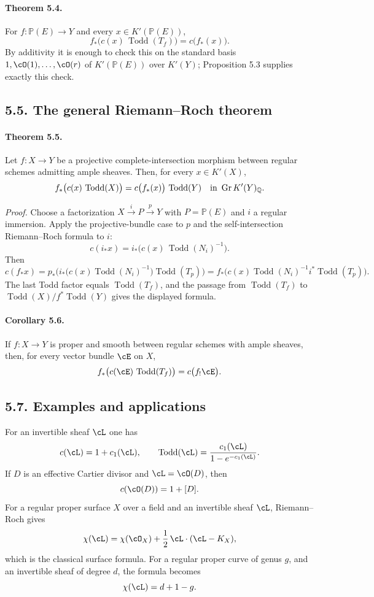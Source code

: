 \documentclass[11pt]{article}
\theoremstyle{plain}
\theoremstyle{definition}
\theoremstyle{remark}
\newcommand{\bP}{\mathbb P}
\newcommand{\QQ}{\mathbb Q}
\DeclareMathOperator{\Gr}{Gr}
\providecommand{\xto}[1]{\xrightarrow{#1}}
\providecommand{\Todd}{\operatorname{Todd}}
\begin{document}
\paragraph{Theorem 5.4.}
For $f:\bP(E)\to Y$ and every $x\in K'(\bP(E))$,
\[
 f_*\bigl(c(x)\,\Todd(T_f)\bigr)=c\bigl(f_*(x)\bigr).
\]
By additivity it is enough to check this on the standard basis $1,\cO(1),\ldots,\cO(r)$ of $K'(\bP(E))$ over $K'(Y)$; Proposition 5.3 supplies exactly this check.

\subsection*{5.5. The general Riemann--Roch theorem}

\paragraph{Theorem 5.5.}
Let $f:X\to Y$ be a projective complete-intersection morphism between regular schemes admitting ample sheaves. Then, for every $x\in K'(X)$,
\[
 f_*\bigl(c(x)\,\Todd(X)\bigr)=c\bigl(f_*(x)\bigr)\,\Todd(Y)
 \quad\hbox{in }\Gr K'(Y)_\QQ .
\]

\emph{Proof.}
Choose a factorization $X\xto{i}P\xto{p}Y$ with $P=\bP(E)$ and $i$ a regular immersion. Apply the projective-bundle case to $p$ and the self-intersection Riemann--Roch formula to $i$:
\[
 c(i_*x)=i_*\bigl(c(x)\,\Todd(N_i)^{-1}\bigr).
\]
Then
\[
 c(f_*x)=p_*\bigl(i_*\bigl(c(x)\Todd(N_i)^{-1}\bigr)\Todd(T_p)\bigr)
       =f_*\bigl(c(x)\Todd(N_i)^{-1}i^*\Todd(T_p)\bigr).
\]
The last Todd factor equals $\Todd(T_f)$, and the passage from $\Todd(T_f)$ to $\Todd(X)/f^*\Todd(Y)$ gives the displayed formula.

\paragraph{Corollary 5.6.}
If $f:X\to Y$ is proper and smooth between regular schemes with ample sheaves, then, for every vector bundle $\cE$ on $X$,
\[
 f_*\bigl(c(\cE)\,\Todd(T_f)\bigr)=c\bigl(f_!\cE\bigr).
\]

\subsection*{5.7. Examples and applications}

For an invertible sheaf $\cL$ one has
\[
 c(\cL)=1+c_1(\cL),\qquad
 \Todd(\cL)=\frac{c_1(\cL)}{1-e^{-c_1(\cL)}}.
\]
If $D$ is an effective Cartier divisor and $\cL=\cO(D)$, then
\[
 c(\cO(D))=1+[D].
\]
For a regular proper surface $X$ over a field and an invertible sheaf $\cL$, Riemann--Roch gives
\[
\chi(\cL)=\chi(\cO_X)+\frac12\,\cL\cdot(\cL-K_X),
\]
which is the classical surface formula. For a regular proper curve of genus $g$, and an invertible sheaf of degree $d$, the formula becomes
\[
 \chi(\cL)=d+1-g.
\]
\end{document}
